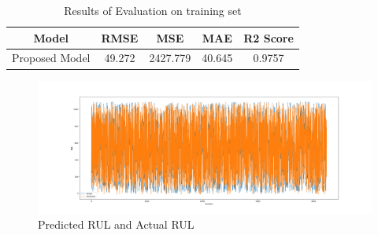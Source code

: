 \documentclass[12pt]{article}
\begin{document}
		\begin{table}[h]
		\centering
		\begin{tabular}{|c|c|c|c|c|}
			\hline
			Model & RMSE & MSE & MAE & R2 Score \\
			\hline
			Proposed Model & 49.272 & 2427.779 & 40.645 &   0.9757 \\
			\hline
		\end{tabular}
		\caption{Results of Evaluation on training set}
		\label{tab:simple_table}
		\end{table}
		
		\begin{figure}[h]
			\centering
			\includegraphics[width=\textwidth]{imgs/predicted.png}
			\caption{Predicted RUL and Actual RUL}
		\end{figure}
		\newpage
\end{document}
